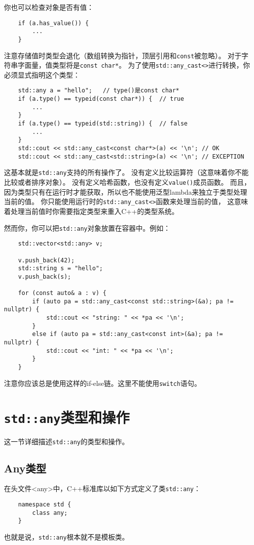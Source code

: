 你也可以检查对象是否有值：
\begin{lstlisting}
    if (a.has_value()) {
        ...
    }
\end{lstlisting}
注意存储值时类型会退化（数组转换为指针，顶层引用和\texttt{const}被忽略）。
对于字符串字面量，值类型将是\texttt{const char*}。
为了使用\texttt{std::any\_cast<>}进行转换，你必须显式指明这个类型：
\begin{lstlisting}
    std::any a = "hello";   // type()是const char*
    if (a.type() == typeid(const char*)) {  // true
        ...
    }
    if (a.type() == typeid(std::string)) {  // false
        ...
    }
    std::cout << std::any_cast<const char*>(a) << '\n'; // OK
    std::cout << std::any_cast<std::string>(a) << '\n'; // EXCEPTION
\end{lstlisting}
这基本就是\texttt{std::any}支持的所有操作了。
没有定义比较运算符（这意味着你不能比较或者排序对象）。
没有定义哈希函数，也没有定义\texttt{value()}成员函数。
而且，因为类型只有在运行时才能获取，所以也不能使用泛型lambda来独立于类型处理当前的值。
你只能使用运行时的\texttt{std::any\_cast<>}函数来处理当前的值，
这意味着处理当前值时你需要指定类型来重入C++的类型系统。

然而你，你可以把\texttt{std::any}对象放置在容器中。例如：
\begin{lstlisting}
    std::vector<std::any> v;

    v.push_back(42);
    std::string s = "hello";
    v.push_back(s);

    for (const auto& a : v) {
        if (auto pa = std::any_cast<const std::string>(&a); pa != nullptr) {
            std::cout << "string: " << *pa << '\n';
        }
        else if (auto pa = std::any_cast<const int>(&a); pa != nullptr) {
            std::cout << "int: " << *pa << '\n';
        }
    }
\end{lstlisting}
注意你应该总是使用这样的if-else链。这里不能使用\texttt{switch}语句。


\section{\texttt{std::any}类型和操作}
这一节详细描述\texttt{std::any}的类型和操作。

\subsection{Any类型}
在头文件<any>中，C++标准库以如下方式定义了类\texttt{std::any}：
\begin{lstlisting}
    namespace std {
        class any;
    }
\end{lstlisting}
也就是说，\texttt{std::any}根本就不是模板类。


